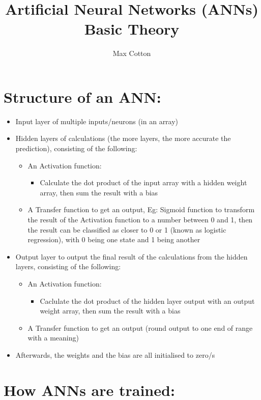 \documentclass[10pt,a4paper]{article}
\title{Artificial Neural Networks (ANNs) Basic Theory}
\author{Max Cotton}
\date{}
\begin{document}
\maketitle

\section{Structure of an ANN:}

\begin{itemize}
    \item Input layer of multiple inputs/neurons (in an array)
    \item Hidden layers of calculations (the more layers, the more accurate the prediction), consisting of the following:
    \begin{itemize}
        \item An Activation function:
        \begin{itemize}
            \item Calculate the dot product of the input array with a hidden weight array, then sum the result with a bias
        \end{itemize}
        \item A Transfer function to get an output, Eg: Sigmoid function to transform the result of the Activation function to a number between 0 and 1, then the result can be classified as closer to 0 or 1 (known as logistic regression), with 0 being one state and 1 being another
    \end{itemize}
    \item Output layer to output the final result of the calculations from the hidden layers, consisting of the following:
    \begin{itemize}
        \item An Activation function:
        \begin{itemize}
            \item Caclulate the dot product of the hidden layer output with an output weight array, then sum the result with a bias
        \end{itemize}
        \item A Transfer function to get an output (round output to one end of range with a meaning)
    \end{itemize}
    \item Afterwards, the weights and the bias are all initialised to zero/s
\end{itemize}

\section{How ANNs are trained:}
\end{document}
